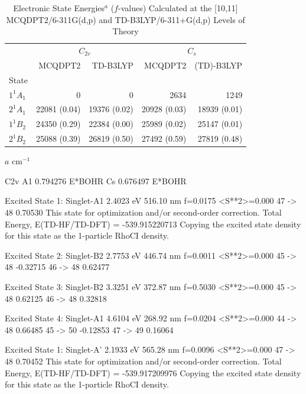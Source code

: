 \documentclass[12pt]{article}
\begin{document}
\begin{table}
  \caption{Electronic State Energies$^a$ ($f$-values) Calculated at the [10,11] MCQDPT2/6-311G(d,p) and TD-B3LYP/6-311+G(d,p) Levels of Theory\label{tab1}}
  \centering
  \begin{tabular}{lrrrr}
    \hline\hline
      & \multicolumn{2}{c}{$C_{2v}$} &  \multicolumn{2}{c}{$C_s$}\\
      \cline{2-5}
      & MCQDPT2 & TD-B3LYP & MCQDPT2 & (TD)-B3LYP\\
      \hline
State \\
$1^1A_1$ & 0            & 0     & 2634  &  1249\\
$2^1A_1$ & 22081 (0.04) & 19376 (0.02) & 20928 (0.03) & 18939 (0.01)\\
$1^1B_2$ & 24350 (0.29) & 22384 (0.00) & 25989 (0.02) & 25147 (0.01)\\
$2^1B_2$ & 25088 (0.39) & 26819 (0.50) & 27492 (0.59) & 27819 (0.48)\\
 \end{tabular}
 
 $a$ cm$^{-1}$
\end{table}





C2v A1 0.794276 E*BOHR
Cs     0.676497 E*BOHR

 Excited State   1:      Singlet-A1     2.4023 eV  516.10 nm  f=0.0175  <S**2>=0.000
      47 -> 48         0.70530
 This state for optimization and/or second-order correction.
 Total Energy, E(TD-HF/TD-DFT) =  -539.915220713
 Copying the excited state density for this state as the 1-particle RhoCI density.

 Excited State   2:      Singlet-B2     2.7753 eV  446.74 nm  f=0.0011  <S**2>=0.000
      45 -> 48        -0.32715
      46 -> 48         0.62477

 Excited State   3:      Singlet-B2     3.3251 eV  372.87 nm  f=0.5030  <S**2>=0.000
      45 -> 48         0.62125
      46 -> 48         0.32818

 Excited State   4:      Singlet-A1     4.6104 eV  268.92 nm  f=0.0204  <S**2>=0.000
      44 -> 48         0.66485
      45 -> 50        -0.12853
      47 -> 49         0.16064



 Excited State   1:      Singlet-A'     2.1933 eV  565.28 nm  f=0.0096  <S**2>=0.000
      47 -> 48         0.70452
 This state for optimization and/or second-order correction.
 Total Energy, E(TD-HF/TD-DFT) =  -539.917209976
 Copying the excited state density for this state as the 1-particle RhoCI density.
\end{document}
